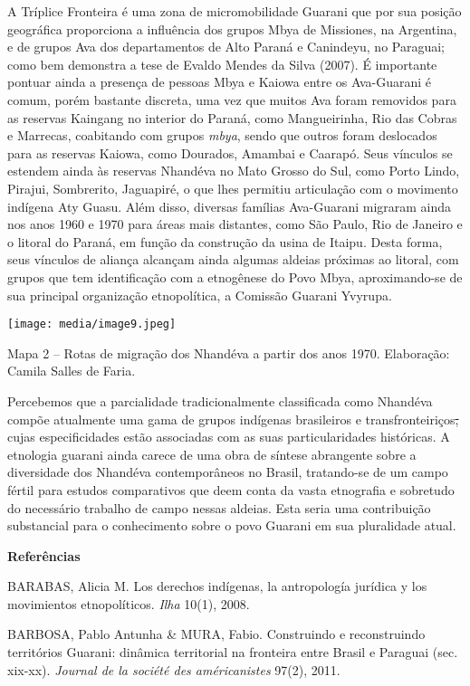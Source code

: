 A Tríplice Fronteira é uma zona de micromobilidade Guarani que por sua
posição geográfica proporciona a influência dos grupos Mbya de
Missiones, na Argentina, e de grupos Ava dos departamentos de Alto
Paraná e Canindeyu, no Paraguai; como bem demonstra a tese de Evaldo
Mendes da Silva (2007). É importante pontuar ainda a presença de pessoas
Mbya e Kaiowa entre os Ava-Guarani é comum, porém bastante discreta, uma
vez que muitos Ava foram removidos para as reservas Kaingang no interior
do Paraná, como Mangueirinha, Rio das Cobras e Marrecas, coabitando com
grupos \emph{mbya}, sendo que outros foram deslocados para as reservas
Kaiowa, como Dourados, Amambai e Caarapó. Seus vínculos se estendem
ainda às reservas Nhandéva no Mato Grosso do Sul, como Porto Lindo,
Pirajui, Sombrerito, Jaguapiré, o que lhes permitiu articulação com o
movimento indígena Aty Guasu. Além disso, diversas famílias Ava-Guarani
migraram ainda nos anos 1960 e 1970 para áreas mais distantes, como São
Paulo, Rio de Janeiro e o litoral do Paraná, em função da construção da
usina de Itaipu. Desta forma, seus vínculos de aliança alcançam ainda
algumas aldeias próximas ao litoral, com grupos que tem identificação
com a etnogênese do Povo Mbya, aproximando-se de sua principal
organização etnopolítica, a Comissão Guarani Yvyrupa.

\texttt{[image: media/image9.jpeg]}

Mapa 2 -- Rotas de migração dos Nhandéva a partir dos anos 1970.
Elaboração: Camila Salles de Faria.

Percebemos que a parcialidade tradicionalmente classificada como
Nhandéva compõe atualmente uma gama de grupos indígenas brasileiros e
transfronteiriços\sout{,} cujas especificidades estão associadas com as
suas particularidades históricas. A etnologia guarani ainda carece de
uma obra de síntese abrangente sobre a diversidade dos Nhandéva
contemporâneos no Brasil, tratando-se de um campo fértil para estudos
comparativos que deem conta da vasta etnografia e sobretudo do
necessário trabalho de campo nessas aldeias. Esta seria uma contribuição
substancial para o conhecimento sobre o povo Guarani em sua pluralidade
atual.

\textbf{Referências}

BARABAS, Alicia M. Los derechos indígenas, la antropología jurídica y
los movimientos etnopolíticos. \emph{Ilha} 10(1), 2008.

BARBOSA, Pablo Antunha \& MURA, Fabio. Construindo e reconstruindo
territórios Guarani: dinâmica territorial na fronteira entre Brasil e
Paraguai (sec. xix-xx). \emph{Journal de la société des américanistes}
97(2), 2011.

